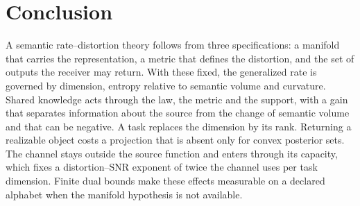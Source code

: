 \documentclass[10pt,journal]{IEEEtran}
\begin{document}
\section{Conclusion}
A semantic rate--distortion theory follows from three specifications: a manifold that carries the representation, a metric that defines the distortion, and the set of outputs the receiver may return. With these fixed, the generalized rate is governed by dimension, entropy relative to semantic volume and curvature. Shared knowledge acts through the law, the metric and the support, with a gain that separates information about the source from the change of semantic volume and that can be negative. A task replaces the dimension by its rank. Returning a realizable object costs a projection that is absent only for convex posterior sets. The channel stays outside the source function and enters through its capacity, which fixes a distortion--SNR exponent of twice the channel uses per task dimension. Finite dual bounds make these effects measurable on a declared alphabet when the manifold hypothesis is not available.

\appendices
\end{document}
